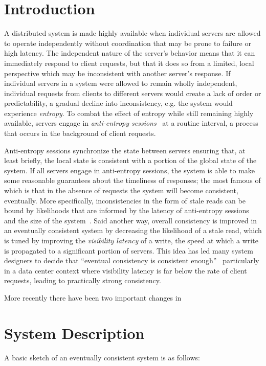 \section*{Introduction}

A distributed system is made highly available when individual servers are
allowed to operate independently without coordination that may be prone to
failure or high latency.
The independent nature of the server's behavior means that it can immediately
respond to client requests, but that it does so from a limited, local
perspective which may be inconsistent with another server's response.
If individual servers in a system were allowed to remain wholly independent,
individual requests from clients to different servers would create a lack of
order or predictability, a gradual decline into inconsistency, e.g. the
system would experience \textit{entropy}.
To combat the effect of entropy while still remaining highly available,
servers engage in \textit{anti-entropy sessions}~\cite{terry_session_1994} at
a routine interval, a process that occurs in the background of client
requests.

Anti-entropy sessions synchronize the state between servers ensuring that,
at least briefly, the local state is consistent with a portion of the global
state of the system.
If all servers engage in anti-entropy sessions, the system is able to make
some reasonable guarantees about the timeliness of responses; the most famous
of which is that in the absence of requests the system will become
consistent, eventually.
More specifically, inconsistencies in the form of stale reads can be bound by
likelihoods that are informed by the latency of anti-entropy sessions and the
size of the system~\cite{bailis_quantifying_2014}.
Said another way, overall consistency is improved in an eventually consistent
system by decreasing the likelihood of a stale read, which is tuned by
improving the \textit{visibility latency} of a write, the speed at which a
write is propagated to a significant portion of servers.
This idea has led many system designers to decide that ``eventual consistency
is consistent enough''~\cite{bermbach_eventual_2011,wada2011data}
particularly in a data center context where visibility latency is far below
the rate of client requests, leading to practically strong consistency.

More recently there have been two important changes in

\section*{System Description}

A basic sketch of an eventually consistent system is as follows:


